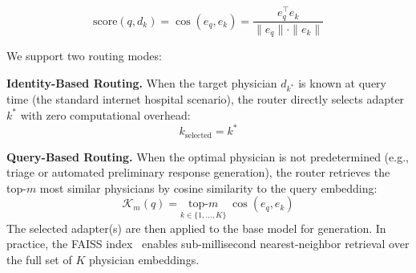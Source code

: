 \begin{equation}
\text{score}(q, d_k) = \cos(e_q, e_k) = \frac{e_q^\top e_k}{\|e_q\| \cdot \|e_k\|}
\end{equation}

We support two routing modes:

\textbf{Identity-Based Routing.} When the target physician $d_{k^*}$ is known at query time (the standard internet hospital scenario), the router directly selects adapter $k^*$ with zero computational overhead:
\begin{equation}
k_{\text{selected}} = k^*
\end{equation}

\textbf{Query-Based Routing.} When the optimal physician is not predetermined (e.g., triage or automated preliminary response generation), the router retrieves the top-$m$ most similar physicians by cosine similarity to the query embedding:
\begin{equation}
\mathcal{K}_m(q) = \underset{k \in \{1,\ldots,K\}}{\text{top-}m}\; \cos(e_q, e_k)
\end{equation}
The selected adapter(s) are then applied to the base model for generation. In practice, the FAISS index~\cite{johnson2019faiss} enables sub-millisecond nearest-neighbor retrieval over the full set of $K$ physician embeddings.

